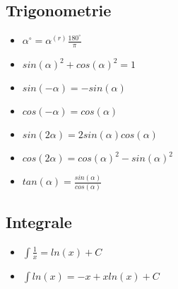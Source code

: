 \subsection{Trigonometrie}
\begin{itemize}
	\item $\alpha^\circ = \alpha^{(r)} \frac{180^\circ}{\pi}$
	\item $sin(\alpha)^2 + cos(\alpha)^2 = 1$
	\item $sin(-\alpha) = - sin(\alpha)$
	\item $cos(-\alpha) = cos(\alpha)$
	\item $sin(2\alpha) = 2 sin(\alpha) cos(\alpha)$
	\item $cos(2\alpha) = cos(\alpha)^2 - sin(\alpha)^2$
	\item $tan(\alpha) = \frac{sin(\alpha)}{cos(\alpha)}$
\end{itemize}

\subsection{Integrale}
\begin{itemize}
    \item $\int \frac{1}{x} = ln(x) + C$
    \item $\int ln(x) = -x + x ln(x) + C$
\end{itemize}
